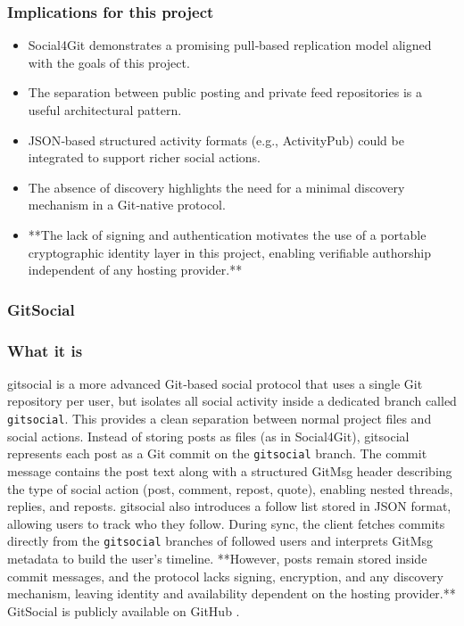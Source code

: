 \subsubsection*{Implications for this project}
\begin{itemize}
    \item Social4Git demonstrates a promising pull‑based replication model aligned with the goals of this project.
    \item The separation between public posting and private feed repositories is a useful architectural pattern.
    \item JSON‑based structured activity formats (e.g., ActivityPub) could be integrated to support richer social actions.
    \item The absence of discovery highlights the need for a minimal discovery mechanism in a Git‑native protocol.
    \item **The lack of signing and authentication motivates the use of a portable cryptographic identity layer in this project, enabling verifiable authorship independent of any hosting provider.**
\end{itemize}
\subsubsection{GitSocial}

\subsubsection*{What it is}
gitsocial is a more advanced Git‑based social protocol that uses a single Git repository per user, but
isolates all social activity inside a dedicated branch called \texttt{gitsocial}. This provides a clean
separation between normal project files and social actions. Instead of storing posts as files (as in
Social4Git), gitsocial represents each post as a Git commit on the \texttt{gitsocial} branch. The commit
message contains the post text along with a structured GitMsg header describing the type of social
action (post, comment, repost, quote), enabling nested threads, replies, and reposts. gitsocial also
introduces a follow list stored in JSON format, allowing users to track who they follow. During sync,
the client fetches commits directly from the \texttt{gitsocial} branches of followed users and interprets
GitMsg metadata to build the user’s timeline. **However, posts remain stored inside commit messages,
and the protocol lacks signing, encryption, and any discovery mechanism, leaving identity and
availability dependent on the hosting provider.** GitSocial is publicly available on GitHub \cite{gitsocial2026}.


